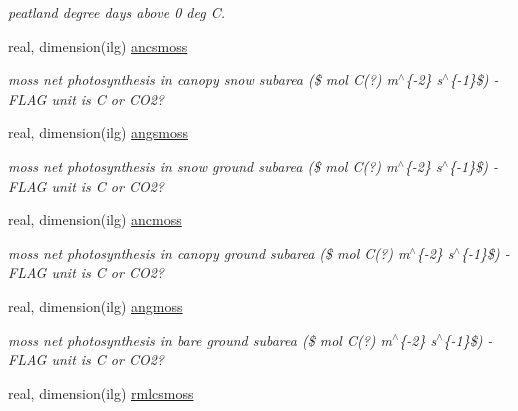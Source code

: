 \begin{DoxyCompactItemize}
\begin{DoxyCompactList}\small\item\em peatland degree days above 0 deg C. \end{DoxyCompactList}\item 
\hypertarget{structctem__statevars_1_1veg__gat_ae2173429a63a8e2139195d96bf0552f0}{}real, dimension(ilg) \hyperlink{structctem__statevars_1_1veg__gat_ae2173429a63a8e2139195d96bf0552f0}{ancsmoss}\label{structctem__statevars_1_1veg__gat_ae2173429a63a8e2139195d96bf0552f0}

\begin{DoxyCompactList}\small\item\em moss net photosynthesis in canopy snow subarea (\$ mol C(?) m$^\wedge$\{-\/2\} s$^\wedge$\{-\/1\}\$) -\/ F\+L\+A\+G unit is C or C\+O2? \end{DoxyCompactList}\item 
\hypertarget{structctem__statevars_1_1veg__gat_a5ace9e04d5066c0e1d96d77705a3b2d1}{}real, dimension(ilg) \hyperlink{structctem__statevars_1_1veg__gat_a5ace9e04d5066c0e1d96d77705a3b2d1}{angsmoss}\label{structctem__statevars_1_1veg__gat_a5ace9e04d5066c0e1d96d77705a3b2d1}

\begin{DoxyCompactList}\small\item\em moss net photosynthesis in snow ground subarea (\$ mol C(?) m$^\wedge$\{-\/2\} s$^\wedge$\{-\/1\}\$) -\/ F\+L\+A\+G unit is C or C\+O2? \end{DoxyCompactList}\item 
\hypertarget{structctem__statevars_1_1veg__gat_ad0719e0bacf49feb3220b223e064c3a6}{}real, dimension(ilg) \hyperlink{structctem__statevars_1_1veg__gat_ad0719e0bacf49feb3220b223e064c3a6}{ancmoss}\label{structctem__statevars_1_1veg__gat_ad0719e0bacf49feb3220b223e064c3a6}

\begin{DoxyCompactList}\small\item\em moss net photosynthesis in canopy ground subarea (\$ mol C(?) m$^\wedge$\{-\/2\} s$^\wedge$\{-\/1\}\$) -\/ F\+L\+A\+G unit is C or C\+O2? \end{DoxyCompactList}\item 
\hypertarget{structctem__statevars_1_1veg__gat_a4dba5c3219b9a00eb9703d3a0e17a4d0}{}real, dimension(ilg) \hyperlink{structctem__statevars_1_1veg__gat_a4dba5c3219b9a00eb9703d3a0e17a4d0}{angmoss}\label{structctem__statevars_1_1veg__gat_a4dba5c3219b9a00eb9703d3a0e17a4d0}

\begin{DoxyCompactList}\small\item\em moss net photosynthesis in bare ground subarea (\$ mol C(?) m$^\wedge$\{-\/2\} s$^\wedge$\{-\/1\}\$) -\/ F\+L\+A\+G unit is C or C\+O2? \end{DoxyCompactList}\item 
\hypertarget{structctem__statevars_1_1veg__gat_a67762db2e026c84ab4c1f888d1a716a1}{}real, dimension(ilg) \hyperlink{structctem__statevars_1_1veg__gat_a67762db2e026c84ab4c1f888d1a716a1}{rmlcsmoss}\label{structctem__statevars_1_1veg__gat_a67762db2e026c84ab4c1f888d1a716a1}


\end{DoxyCompactItemize}
